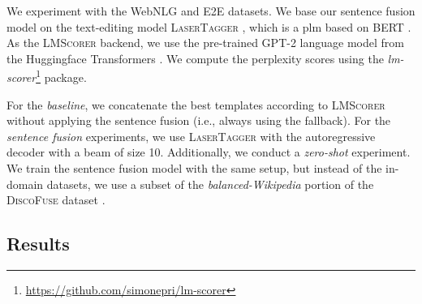 \documentclass[12pt,notitlepage,a4paper,oneside,openany]{report}
\renewcommand\cite{\citep}
\begin{document}
We experiment with the WebNLG and E2E datasets. We base our sentence fusion model on the text-editing model \textsc{LaserTagger} \cite{malmi2019lasertagger}, which is a \ac{plm} based on BERT \cite{devlinBERTPretrainingDeep2019}.  As the \textsc{LMScorer} backend, we use the pre-trained GPT-2 language model \citep{radford2019language} from the Huggingface Transformers \citep{wolf2019HuggingFacesTS}. We compute the perplexity scores using the \textit{lm-scorer}\footnote{\url{https://github.com/simonepri/lm-scorer}} package.


For the \emph{baseline}, we concatenate the best templates according to \textsc{LMScorer} without applying the sentence fusion (i.e., always using the fallback). For the \emph{sentence fusion} experiments, we use \textsc{LaserTagger} with the autoregressive decoder with a beam of size 10.  Additionally, we conduct a \textit{zero-shot} experiment. We train the sentence fusion model with the same setup, but instead of the in-domain datasets, we use a subset of the \emph{balanced-Wikipedia} portion of the \textsc{DiscoFuse} dataset \cite{geva-etal-2019-discofuse}.


\subsection{Results}
\label{sec:iterative:results}
\end{document}
